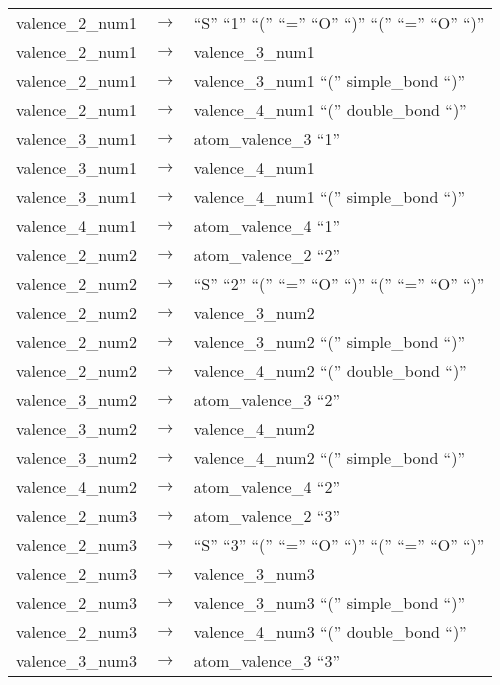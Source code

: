 \documentclass[../Document.tex]{subfiles}
\begin{document}
\begin{longtable}{m{} p{} p{}}
    valence\_2\_num1 & $\rightarrow$ & ``S'' ``1'' ``('' ``='' ``O'' ``)'' ``('' ``='' ``O'' ``)'' \\
    valence\_2\_num1 & $\rightarrow$ & valence\_3\_num1 \\
    valence\_2\_num1 & $\rightarrow$ & valence\_3\_num1 ``('' simple\_bond ``)'' \\
    valence\_2\_num1 & $\rightarrow$ & valence\_4\_num1 ``('' double\_bond ``)'' \\
    valence\_3\_num1 & $\rightarrow$ & atom\_valence\_3 ``1'' \\
    valence\_3\_num1 & $\rightarrow$ & valence\_4\_num1 \\
    valence\_3\_num1 & $\rightarrow$ & valence\_4\_num1 ``('' simple\_bond ``)'' \\
    valence\_4\_num1 & $\rightarrow$ & atom\_valence\_4 ``1'' \\
    valence\_2\_num2 & $\rightarrow$ & atom\_valence\_2 ``2'' \\
    valence\_2\_num2 & $\rightarrow$ & ``S'' ``2'' ``('' ``='' ``O'' ``)'' ``('' ``='' ``O'' ``)'' \\
    valence\_2\_num2 & $\rightarrow$ & valence\_3\_num2 \\
    valence\_2\_num2 & $\rightarrow$ & valence\_3\_num2 ``('' simple\_bond ``)'' \\
    valence\_2\_num2 & $\rightarrow$ & valence\_4\_num2 ``('' double\_bond ``)'' \\
    valence\_3\_num2 & $\rightarrow$ & atom\_valence\_3 ``2'' \\
    valence\_3\_num2 & $\rightarrow$ & valence\_4\_num2 \\
    valence\_3\_num2 & $\rightarrow$ & valence\_4\_num2 ``('' simple\_bond ``)'' \\
    valence\_4\_num2 & $\rightarrow$ & atom\_valence\_4 ``2'' \\
    valence\_2\_num3 & $\rightarrow$ & atom\_valence\_2 ``3'' \\
    valence\_2\_num3 & $\rightarrow$ & ``S'' ``3'' ``('' ``='' ``O'' ``)'' ``('' ``='' ``O'' ``)'' \\
    valence\_2\_num3 & $\rightarrow$ & valence\_3\_num3 \\
    valence\_2\_num3 & $\rightarrow$ & valence\_3\_num3 ``('' simple\_bond ``)'' \\
    valence\_2\_num3 & $\rightarrow$ & valence\_4\_num3 ``('' double\_bond ``)'' \\
    valence\_3\_num3 & $\rightarrow$ & atom\_valence\_3 ``3'' \\

\end{longtable}
\end{document}
